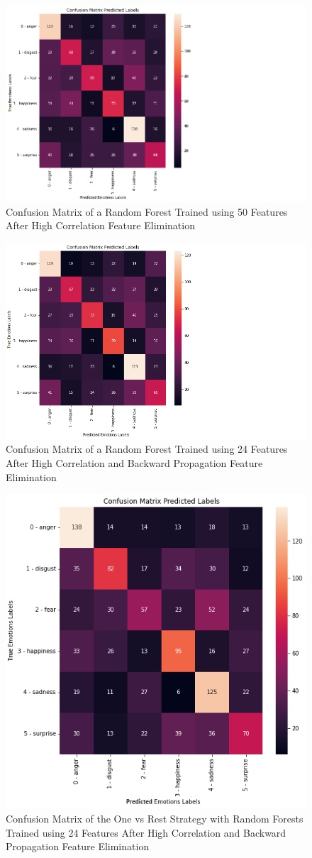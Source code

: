 \begin{figure}[H]
	\centering
	\includegraphics[width=.55\linewidth]{figs/appendix/feature_selection/cmSec.png}
	\caption{Confusion Matrix of a Random Forest Trained using 50 Features After High Correlation Feature Elimination}
	\label{fig:confMatrix2}
\end{figure}


\begin{figure}[H]
	\centering
	\includegraphics[width=.55\linewidth]{figs/appendix/feature_selection/cmThird.png}
	\caption{Confusion Matrix of a Random Forest Trained using 24 Features After High Correlation and Backward Propagation Feature Elimination}
	\label{fig:confMatrix3}
\end{figure}

\begin{figure}[H]
	\centering
	\includegraphics[width=.55\linewidth]{figs/appendix/feature_selection/cm4.png}
	\caption{Confusion Matrix of the One vs Rest Strategy with Random Forests Trained using 24 Features After High Correlation and Backward Propagation Feature Elimination}
	\label{fig:confMatrix4}
\end{figure}

